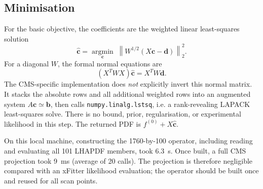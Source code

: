 \documentclass[11pt]{article}
\begin{document}
\subsection{Minimisation}

For the basic objective, the coefficients are the weighted linear least-squares
solution
\begin{equation}
  \hat{\boldsymbol c}=\underset{\boldsymbol c}{\operatorname{argmin}}
  \;\left\|W^{1/2}(X\boldsymbol c-\boldsymbol d)\right\|_2^2.
\end{equation}
For a diagonal $W$, the formal normal equations are
\begin{equation}
  (X^T W X)\hat{\boldsymbol c}=X^T W\boldsymbol d.
\end{equation}
The CMS-specific implementation does \emph{not} explicitly invert this
normal matrix. It stacks the absolute rows and all additional weighted rows
into an augmented system $A\boldsymbol c\simeq\boldsymbol b$, then calls
\texttt{numpy.linalg.lstsq}, i.e. a rank-revealing LAPACK least-squares solve.
There is no bound, prior, regularisation, or experimental likelihood in this
step. The returned PDF is $f^{(0)}+X\hat{\boldsymbol c}$.

On this local machine, constructing the 1760-by-100 operator, including
reading and evaluating all 101 LHAPDF members, took 6.3~s. Once built, a
full CMS projection took 9~ms (average of 20 calls). The projection is
therefore negligible compared with an xFitter likelihood evaluation; the
operator should be built once and reused for all scan points.
\end{document}
